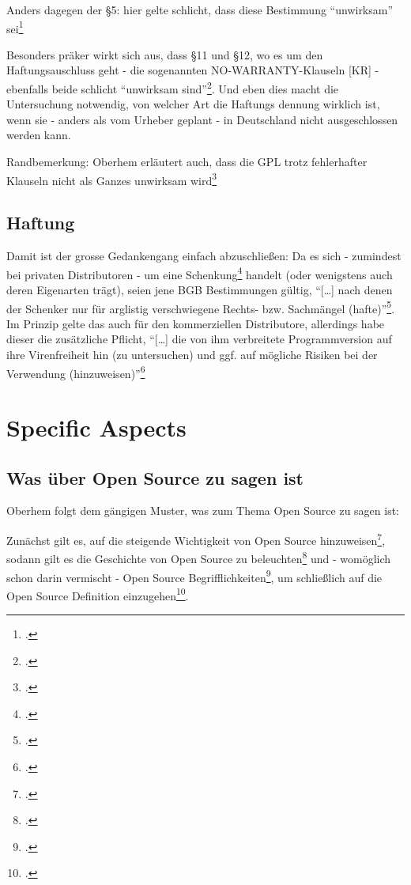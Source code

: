 \documentclass[DIV=calc,BCOR=5mm,11pt,headings=small,oneside,abstract=true, toc=bib]{scrartcl}
\begin{document}
Anders dagegen der §5: hier gelte schlicht, dass diese Bestimmung
\enquote{unwirksam} sei\footcite[vgl.][146]{Oberhem2008a}

Besonders präker wirkt sich aus, dass §11 und §12, wo es um den
Haftungsauschluss geht - die sogenannten NO-WARRANTY-Klauseln [KR] - ebenfalls
beide schlicht \enquote{unwirksam sind}\footcite[vgl.][150f]{Oberhem2008a}.
Und eben dies macht die Untersuchung notwendig, von welcher Art die Haftungs
dennung wirklich ist, wenn sie - anders als vom Urheber geplant - in Deutschland
nicht ausgeschlossen werden kann.

Randbemerkung: Oberhem erläutert auch, dass die GPL trotz fehlerhafter Klauseln
nicht als Ganzes unwirksam wird\footcite[vgl.][159]{Oberhem2008a}

\subsection{Haftung}

Damit ist der grosse Gedankengang einfach abzuschließen: Da es sich - zumindest
bei privaten Distributoren - um eine
Schenkung\footcite[vgl.][163ff]{Oberhem2008a} handelt (oder wenigstens auch
deren Eigenarten trägt), seien jene BGB Bestimmungen gültig, \enquote{[\ldots]
nach denen der Schenker nur für arglistig verschwiegene Rechts- bzw.
Sachmängel (hafte)}\footcite[vgl.][171]{Oberhem2008a}. Im Prinzip gelte
das auch für den kommerziellen Distributore, allerdings habe dieser die
zusätzliche Pflicht, \enquote{[\ldots] die von ihm verbreitete
Programmversion auf ihre Virenfreiheit hin (zu untersuchen) und ggf. auf
mögliche Risiken bei der Verwendung
(hinzuweisen)}\footcite[vgl.][211]{Oberhem2008a}


\section{Specific Aspects}

\subsection{Was über Open Source zu sagen ist}

Oberhem folgt dem gängigen Muster, was zum Thema Open Source zu sagen ist:

Zunächst gilt es, auf die steigende Wichtigkeit von Open Source
hinzuweisen\footcite[vgl.][1f]{Oberhem2008a}, sodann gilt es die Geschichte von
Open Source zu beleuchten\footcite[vgl.][17ff]{Oberhem2008a} und - womöglich
schon darin vermischt - Open Source
Begrifflichkeiten\footcite[vgl.][6ff]{Oberhem2008a}, um schließlich auf die Open
Source Definition einzugehen\footcite[vgl.][10ff]{Oberhem2008a}.
\end{document}
